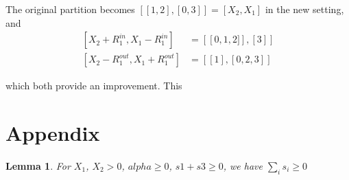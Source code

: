\documentclass{article}
\newtheorem{lemma}{Lemma}
\theoremstyle{case}
\begin{document}
The original partition becomes $\left[ \left[ 1, 2\right], \left[ 0, 3\right] \right] = \left[ X_2, X_1\right]$ in the new setting, and
\begin{align*}
\left[ X_2 + R_1^{in}, X_1 - R_1^{in}\right]  &= \left[ \left[0,1,2] \right], \left[ 3\right] \right] \\
\left[ X_2 - R_1^{out}, X_1 + R_1^{out}\right] & = \left[ \left[ 1 \right], \left[ 0, 2, 3 \right] \right]
\end{align*}

which both provide an improvement. This 

\cleardoublepage
\appendix
\section{Appendix}
\begin{lemma}
For $X_1$, $X_2 > 0$, $alpha \geq 0$, $s1 + s3 \geq 0$, we have $\sum_i s_i \geq 0$
\end{lemma}
\end{document}
